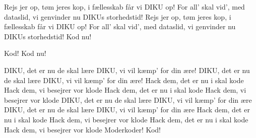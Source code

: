 \documentclass[a4paper,11pt]{article}
\begin{document}
\begin{song}
 Rejs jer op, tøm jeres kop, i fællesskab får vi DIKU op!
For all' skal vid', med dataslid, vi genvinder nu DIKUs storhedstid!
Rejs jer op, tøm jeres kop, i fællesskab får vi DIKU op!
For all' skal vid', med dataslid, vi genvinder nu DIKUs storhedstid!
Kod nu!

 Kod! Kod nu!

DIKU, det er nu de skal lære
DIKU, vi vil kæmp' for din ære!
DIKU, det er nu de skal lære
DIKU, vi vil kæmp' for din ære!
Hack dem, det er nu i skal kode
Hack dem, vi besejrer vor klode
Hack dem, det er nu i skal kode
Hack dem, vi besejrer vor klode
DIKU, det er nu de skal lære
DIKU, vi vil kæmp' for din ære
DIKU, det er nu de skal lære
DIKU, vi vil kæmp' for din ære
Hack dem, det er nu i skal kode
Hack dem, vi besejrer vor klode
Hack dem, det er nu i skal kode
Hack dem, vi besejrer vor klode
Moderkoder!
Kod!

\end{song}
\end{document}
